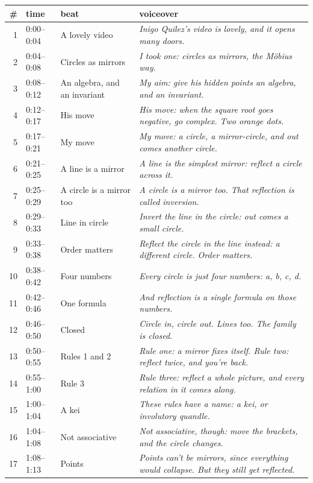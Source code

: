 \documentclass[10pt]{article}
\begin{document}
{\scriptsize\begin{longtable}{rllp{}}\toprule \# & time & beat & voiceover\\\midrule
1 & 0:00--0:04 & A lovely video & \emph{Inigo Quilez's video is lovely, and it opens many doors.}\\
2 & 0:04--0:08 & Circles as mirrors & \emph{I took one: circles as mirrors, the Möbius way.}\\
3 & 0:08--0:12 & An algebra, and an invariant & \emph{My aim: give his hidden points an algebra, and an invariant.}\\
4 & 0:12--0:17 & His move & \emph{His move: when the square root goes negative, go complex. Two orange dots.}\\
5 & 0:17--0:21 & My move & \emph{My move: a circle, a mirror-circle, and out comes another circle.}\\
6 & 0:21--0:25 & A line is a mirror & \emph{A line is the simplest mirror: reflect a circle across it.}\\
7 & 0:25--0:29 & A circle is a mirror too & \emph{A circle is a mirror too. That reflection is called inversion.}\\
8 & 0:29--0:33 & Line in circle & \emph{Invert the line in the circle: out comes a small circle.}\\
9 & 0:33--0:38 & Order matters & \emph{Reflect the circle in the line instead: a different circle. Order matters.}\\
10 & 0:38--0:42 & Four numbers & \emph{Every circle is just four numbers: a, b, c, d.}\\
11 & 0:42--0:46 & One formula & \emph{And reflection is a single formula on those numbers.}\\
12 & 0:46--0:50 & Closed & \emph{Circle in, circle out. Lines too. The family is closed.}\\
13 & 0:50--0:55 & Rules 1 and 2 & \emph{Rule one: a mirror fixes itself. Rule two: reflect twice, and you're back.}\\
14 & 0:55--1:00 & Rule 3 & \emph{Rule three: reflect a whole picture, and every relation in it comes along.}\\
15 & 1:00--1:04 & A kei & \emph{These rules have a name: a kei, or involutory quandle.}\\
16 & 1:04--1:08 & Not associative & \emph{Not associative, though: move the brackets, and the circle changes.}\\
17 & 1:08--1:13 & Points & \emph{Points can't be mirrors, since everything would collapse. But they still get reflected.}\\

\end{longtable}}
\end{document}
